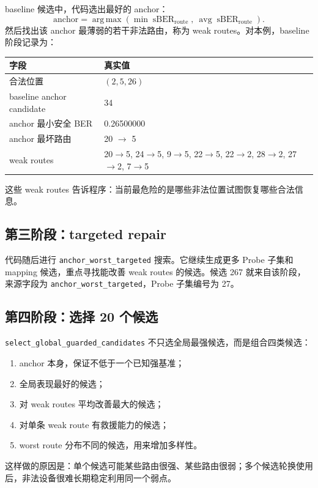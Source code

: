 \documentclass[UTF8,a4paper,11pt]{ctexart}
\newcommand{\sBER}{\operatorname{sBER}}
\newcommand{\argmax}{\operatorname*{arg\,max}}
\begin{document}
baseline 候选中，代码选出最好的 anchor：
\[
\text{anchor}=\argmax(\min \sBER_{\mathrm{route}},\ \operatorname{avg}\sBER_{\mathrm{route}}).
\]
然后找出该 anchor 最薄弱的若干非法路由，称为 weak routes。对本例，baseline 阶段记录为：
\begin{center}
\begin{tabular}{ll}
\toprule
字段 & 真实值\\
\midrule
合法位置 & $(2,5,26)$\\
baseline anchor candidate & 34\\
anchor 最小安全 BER & 0.26500000\\
anchor 最坏路由 & 20 $\rightarrow$ 5\\
weak routes & 20$\rightarrow$5, 24$\rightarrow$5, 9$\rightarrow$5, 22$\rightarrow$5, 22$\rightarrow$2, 28$\rightarrow$2, 27$\rightarrow$2, 7$\rightarrow$5\\
\bottomrule
\end{tabular}
\end{center}

这些 weak routes 告诉程序：当前最危险的是哪些非法位置试图恢复哪些合法信息。

\subsection{第三阶段：targeted repair}

代码随后进行 \texttt{anchor\_worst\_targeted} 搜索。它继续生成更多 Probe 子集和 mapping 候选，重点寻找能改善 weak routes 的候选。候选 267 就来自该阶段，来源字段为 \texttt{anchor\_worst\_targeted}，Probe 子集编号为 27。

\subsection{第四阶段：选择 20 个候选}

\texttt{select\_global\_guarded\_candidates} 不只选全局最强候选，而是组合四类候选：
\begin{enumerate}[label=(\arabic*)]
  \item anchor 本身，保证不低于一个已知强基准；
  \item 全局表现最好的候选；
  \item 对 weak routes 平均改善最大的候选；
  \item 对单条 weak route 有救援能力的候选；
  \item worst route 分布不同的候选，用来增加多样性。
\end{enumerate}
这样做的原因是：单个候选可能某些路由很强、某些路由很弱；多个候选轮换使用后，非法设备很难长期稳定利用同一个弱点。
\end{document}
